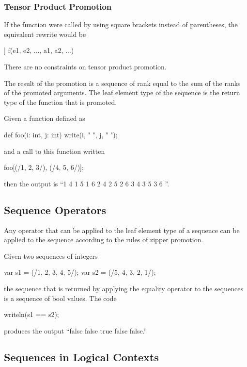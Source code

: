\subsubsection{Tensor Product Promotion}
\label{Tensor_Product_Promotion}

If the function  were called by using square brackets instead
of parentheses, the equivalent rewrite would be
\begin{chapel}
[(e1, e2, ...) in [s1, s2, ...]] f(e1, e2, ..., a1, a2, ...)
\end{chapel}
There are no constraints on tensor product promotion.

The result of the promotion is a sequence of rank equal to the sum of
the ranks of the promoted arguments.  The leaf element type of the
sequence is the return type of the function that is promoted.

\begin{example}
Given a function defined as
\begin{chapel}
def foo(i: int, j: int) {
  write(i, " ", j, " ");
}
\end{chapel}
and a call to this function written
\begin{chapel}
foo[(/1, 2, 3/), (/4, 5, 6/)];
\end{chapel}
then the output is ``1 4 1 5 1 6 2 4 2 5 2 6 3 4 3 5 3 6 ''.
\end{example}

\subsection{Sequence Operators}
\label{Sequence_Operators}

Any operator that can be applied to the leaf element type of a
sequence can be applied to the sequence according to the rules of
zipper promotion.
\begin{example}
Given two sequences of integers
\begin{chapel}
var s1 = (/1, 2, 3, 4, 5/);
var s2 = (/5, 4, 3, 2, 1/);
\end{chapel}
the sequence that is returned by applying the equality operator to the
sequences is a sequence of bool values.  The code
\begin{chapel}
writeln(s1 == s2);
\end{chapel}
produces the output ``false false true false false.''
\end{example}

\subsection{Sequences in Logical Contexts}
\label{Sequences_in_Logical_Contexts}

